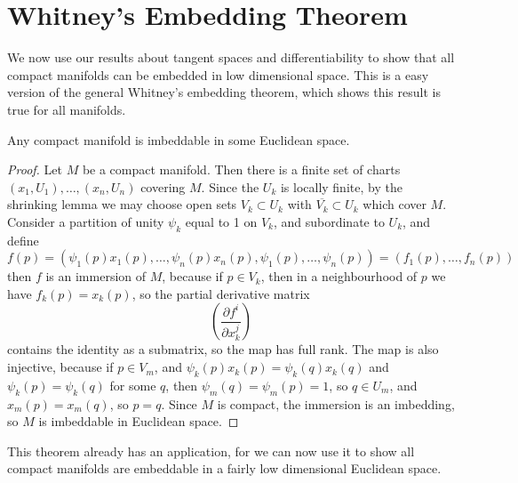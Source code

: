 \section{Whitney's Embedding Theorem}

We now use our results about tangent spaces and differentiability to show that all compact manifolds can be embedded in low dimensional space. This is a easy version of the general Whitney's embedding theorem, which shows this result is true for all manifolds.

\begin{lemma}
    Any compact manifold is imbeddable in some Euclidean space.
\end{lemma}
\begin{proof}
    Let $M$ be a compact manifold. Then there is a finite set of charts $(x_1,U_1), \dots, (x_n,U_n)$ covering $M$. Since the $U_k$ is locally finite, by the shrinking lemma we may choose open sets $V_k \subset U_k$ with $\overline{V_k} \subset U_k$ which cover $M$. Consider a partition of unity $\psi_k$ equal to 1 on $V_k$, and subordinate to $U_k$, and define
    \[ f(p) = (\psi_1(p) x_1(p), \dots, \psi_n(p) x_n(p), \psi_1(p), \dots, \psi_n(p)) = (f_1(p), \dots, f_n(p)) \]
    then $f$ is an immersion of $M$, because if $p \in V_k$, then in a neighbourhood of $p$ we have $f_k(p) = x_k(p)$, so the partial derivative matrix
    \[ \left( \frac{\partial f^i}{\partial x_k^j} \right) \]
    contains the identity as a submatrix, so the map has full rank. The map is also injective, because if $p \in V_m$, and $\psi_k(p) x_k(p) = \psi_k(q) x_k(q)$ and $\psi_k(p) = \psi_k(q)$ for some $q$, then $\psi_m(q) = \psi_m(p) = 1$, so $q \in U_m$, and $x_m(p) = x_m(q)$, so $p = q$. Since $M$ is compact, the immersion is an imbedding, so $M$ is imbeddable in Euclidean space.
\end{proof}

This theorem already has an application, for we can now use it to show all compact manifolds are embeddable in a fairly low dimensional Euclidean space.

